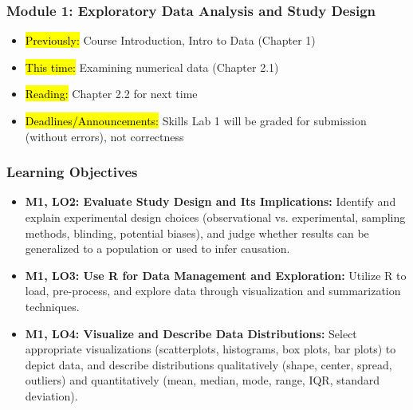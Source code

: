 
\begin{frame}
    \frametitle{Module 1: Exploratory Data Analysis and Study Design}
    \begin{itemize}
        \item \hl{Previously: } Course Introduction, Intro to Data (Chapter 1)
        \item \hl{This time: } Examining numerical data (Chapter 2.1)
        \item \hl{Reading: } Chapter 2.2 for next time
        \item \hl{Deadlines/Announcements: } Skills Lab 1 will be graded for submission (without errors), not correctness
    \end{itemize}
    
\end{frame}

\begin{frame}
    \frametitle{Learning Objectives}    
    \begin{itemize}
        \item \textbf{M1, LO2: Evaluate Study Design and Its Implications:} Identify and explain experimental design choices (observational vs. experimental, sampling methods, blinding, potential biases), and judge whether results can be generalized to a population or used to infer causation. 
        \item \textbf{M1, LO3: Use R for Data Management and Exploration:} Utilize R to load, pre-process, and explore data through visualization and summarization techniques.
        \item \textbf{M1, LO4: Visualize and Describe Data Distributions:} Select appropriate visualizations (scatterplots, histograms, box plots, bar plots) to depict data, and describe distributions qualitatively (shape, center, spread, outliers) and quantitatively (mean, median, mode, range, IQR, standard deviation).
    \end{itemize}
\end{frame}
